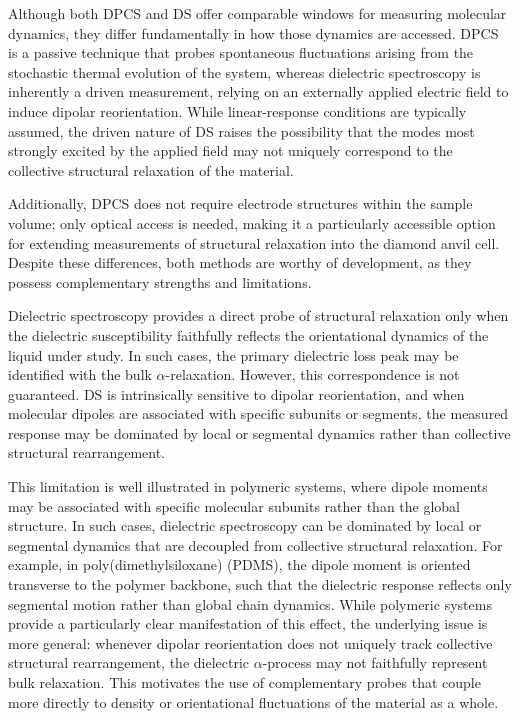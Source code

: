 Although both DPCS and DS offer comparable windows for measuring molecular dynamics, they differ fundamentally in how those dynamics are accessed. DPCS is a passive technique that probes spontaneous fluctuations arising from the stochastic thermal evolution of the system, whereas dielectric spectroscopy is inherently a driven measurement, relying on an externally applied electric field to induce dipolar reorientation. While linear-response conditions are typically assumed, the driven nature of DS raises the possibility that the modes most strongly excited by the applied field may not uniquely correspond to the collective structural relaxation of the material.

Additionally, DPCS does not require electrode structures within the sample volume; only optical access is needed, making it a particularly accessible option for extending measurements of structural relaxation into the diamond anvil cell. Despite these differences, both methods are worthy of development, as they possess complementary strengths and limitations.

Dielectric spectroscopy provides a direct probe of structural relaxation only when the dielectric susceptibility faithfully reflects the orientational dynamics of the liquid under study. In such cases, the primary dielectric loss peak may be identified with the bulk $\alpha$-relaxation. However, this correspondence is not guaranteed. DS is intrinsically sensitive to dipolar reorientation, and when molecular dipoles are associated with specific subunits or segments, the measured response may be dominated by local or segmental dynamics rather than collective structural rearrangement. 

This limitation is well illustrated in polymeric systems, where dipole moments may be associated with specific molecular subunits rather than the global structure. In such cases, dielectric spectroscopy can be dominated by local or segmental dynamics that are decoupled from collective structural relaxation. For example, in poly(dimethylsiloxane) (PDMS), the dipole moment is oriented transverse to the polymer backbone, such that the dielectric response reflects only segmental motion rather than global chain dynamics\cite{Wrzesinska2020}. While polymeric systems provide a particularly clear manifestation of this effect, the underlying issue is more general: whenever dipolar reorientation does not uniquely track collective structural rearrangement, the dielectric $\alpha$-process may not faithfully represent bulk relaxation. This motivates the use of complementary probes that couple more directly to density or orientational fluctuations of the material as a whole.

